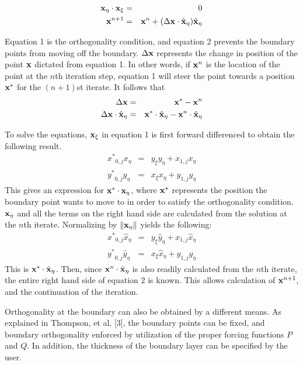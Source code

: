 \begin{eqnarray}
{\mathord{\mathbf{x}}}_{\eta}\cdot{\mathord{\mathbf{x}}}_{\xi} &=& 0      \\
\mathord{\mathbf{x}}^{n+1} &=& \mathord{\mathbf{x}}^n + (\Delta\mathord{\mathbf{x}}\cdot{\hat{\mathord{\mathbf{x}}}}_{\eta}){\hat{\mathord{\mathbf{x}}}}_{\eta}
\end{eqnarray}

Equation 1 is the orthogonality condition, and equation 2 prevents the boundary 
points from moving off the boundary.  $\Delta\mathord{\mathbf{x}}$ represents the change in 
position of the point $\mathord{\mathbf{x}}$ dictated from equation 1.  In other words, if $\mathord{\mathbf{x}}^n$
is the location of the point at the $n$th iteration step, equation 1 will steer 
the point towards a position $\mathord{\mathbf{x}}^*$ for the $(n+1)$st iterate.  It follows that
\begin{eqnarray*}
\Delta\mathord{\mathbf{x}}&=&\mathord{\mathbf{x}}^*-\mathord{\mathbf{x}}^n\\
\Delta\mathord{\mathbf{x}}\cdot{\hat{\mathord{\mathbf{x}}}}_{\eta}&=&{\mathord{\mathbf{x}}}^{*}\cdot{\hat{\mathord{\mathbf{x}}}}_{\eta}-
{\mathord{\mathbf{x}}}^{n}\cdot{\hat{\mathord{\mathbf{x}}}}_{\eta}
\end{eqnarray*}

To solve the equations, ${\mathord{\mathbf{x}}}_{\xi}$ in equation 1 is first forward differenced 
to obtain the following result.
\begin{eqnarray}
{x^*}_{0,j}x_{\eta} &=& y_{\xi}y_{\eta}+x_{1,j}x_{\eta}\\
{y^*}_{0,j}y_{\eta} &=& x_{\xi}x_{\eta}+y_{1,j}y_{\eta}
\end{eqnarray}
This gives an expression for ${\mathord{\mathbf{x}}}^{*}\cdot{\mathord{\mathbf{x}}}_{\eta}$, where
$\mathord{\mathbf{x}}^*$ represents the position the boundary point wants to move to
in order to satisfy the orthogonality condition.  $\mathord{\mathbf{x}}_{\eta}$ and
all the terms on the right hand side
are calculated from the solution at the $n$th iterate.
Normalizing by $\|{\mathord{\mathbf{x}}}_{\eta}\|$
yields the following:
\begin{eqnarray}
{x^*}_{0,j}{\hat{x}}_{\eta} &=& y_{\xi}{\hat{y}}_{\eta}+x_{1,j}{\hat{x}}_{\eta}\\
{y^*}_{0,j}{\hat{y}}_{\eta} &=& x_{\xi}{\hat{x}}_{\eta}+y_{1,j}{\hat{y}}_{\eta}
\end{eqnarray}
This is ${\mathord{\mathbf{x}}}^{*}\cdot{\hat{\mathord{\mathbf{x}}}}_{\eta}$.  Then, since 
${\mathord{\mathbf{x}}}^{n}\cdot{\hat{\mathord{\mathbf{x}}}}_{\eta}$ is also readily calculated from the $n$th iterate,
the entire right hand side of equation 2 is known.  This allows calculation of 
${\mathord{\mathbf{x}}}^{n+1}$, and the continuation of the iteration.

Orthogonality at the boundary can also be obtained by a different means.  As explained in
Thompson, et al. [3], the boundary points can be fixed, and boundary orthogonality 
enforced
by utilization of the proper forcing functions $P$ and $Q$.  In addition, the 
thickness of the boundary layer can be specified by the user.  

